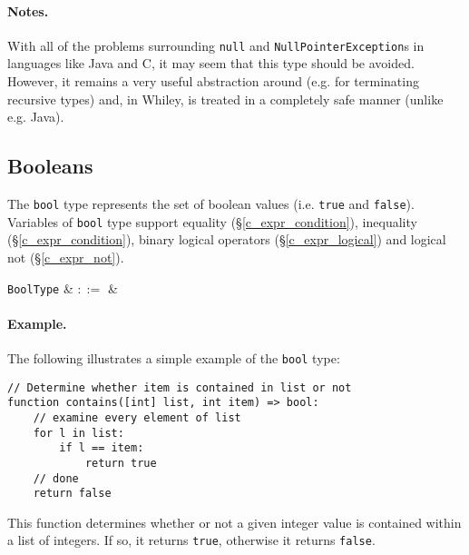 \paragraph{Notes.}  With all of the problems surrounding \lstinline{null} and \lstinline{NullPointerException}s in languages like Java and C, it may seem that this type should be avoided. However, it remains a very useful abstraction around (e.g. for terminating recursive types) and, in Whiley, is treated in a completely safe manner (unlike e.g. Java).


\subsection{Booleans}
\label{c_types_bool}

The \lstinline{bool} type represents the set of boolean values (i.e. \lstinline{true} and \lstinline{false}).  Variables of \lstinline{bool} type support equality (\S\ref{c_expr_condition}), inequality (\S\ref{c_expr_condition}), binary logical operators (\S\ref{c_expr_logical}) and logical not (\S\ref{c_expr_not}).

\begin{syntax}
 \verb+BoolType+ & $::=$ &  \\
\end{syntax}

\paragraph{Example.} The following illustrates a simple example of the \lstinline{bool} type:

\begin{lstlisting}
// Determine whether item is contained in list or not
function contains([int] list, int item) => bool:
    // examine every element of list
    for l in list:
        if l == item:
            return true
    // done
    return false
\end{lstlisting}
This function determines whether or not a given integer value is contained within a list of integers.  If so, it returns \lstinline{true}, otherwise it returns \lstinline{false}.



